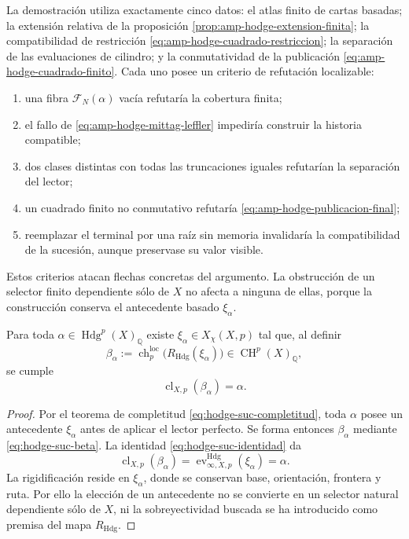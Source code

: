 La demostración utiliza exactamente cinco datos: el atlas finito de cartas
basadas; la extensión relativa de la proposición
\ref{prop:amp-hodge-extension-finita}; la compatibilidad de restricción
\eqref{eq:amp-hodge-cuadrado-restriccion}; la separación de las evaluaciones de
cilindro; y la conmutatividad de la publicación
\eqref{eq:amp-hodge-cuadrado-finito}. Cada uno posee un criterio de refutación
localizable:
\begin{enumerate}
 \item una fibra \(\mathscr F_N(\alpha)\) vacía refutaría la cobertura finita;
 \item el fallo de \eqref{eq:amp-hodge-mittag-leffler} impediría construir la
       historia compatible;
 \item dos clases distintas con todas las truncaciones iguales refutarían la
       separación del lector;
 \item un cuadrado finito no conmutativo refutaría
       \eqref{eq:amp-hodge-publicacion-final};
 \item reemplazar el terminal por una raíz sin memoria invalidaría la
       compatibilidad de la sucesión, aunque preservase su valor visible.
\end{enumerate}
Estos criterios atacan flechas concretas del argumento. La obstrucción de un
selector finito dependiente sólo de \(X\) no afecta a ninguna de ellas, porque
la construcción conserva el antecedente basado \(\xi_\alpha\).

\begin{theorem}
\label{thm:hodge-suc-generacion}
Para toda \(\alpha\in\operatorname{Hdg}^{p}(X)_{\mathbb Q}\) existe
\(\xi_{\alpha}\in X_{\chi}(X,p)\) tal que, al definir
\begin{equation}\label{eq:hodge-suc-beta}
 \beta_{\alpha}:=
 \operatorname{ch}^{\mathrm{loc}}_{p}
 \bigl(R_{\mathrm{Hdg}}(\xi_{\alpha})\bigr)
 \in\operatorname{CH}^{p}(X)_{\mathbb Q},
\end{equation}
se cumple
\begin{equation}\label{eq:hodge-suc-cl-beta}
 \operatorname{cl}_{X,p}(\beta_{\alpha})=\alpha.
\end{equation}
\end{theorem}

\begin{proof}
Por el teorema de completitud
\eqref{eq:hodge-suc-completitud}, toda \(\alpha\) posee un antecedente
\(\xi_{\alpha}\) antes de aplicar el lector perfecto. Se forma entonces
\(\beta_{\alpha}\) mediante \eqref{eq:hodge-suc-beta}. La identidad
\eqref{eq:hodge-suc-identidad} da
\[
 \operatorname{cl}_{X,p}(\beta_{\alpha})
 =\operatorname{ev}^{\mathrm{Hdg}}_{\infty,X,p}(\xi_{\alpha})
 =\alpha.
\]
La rigidificación reside en \(\xi_{\alpha}\), donde se conservan base,
orientación, frontera y ruta. Por ello la elección de un antecedente no se
convierte en un selector natural dependiente sólo de \(X\), ni la
sobreyectividad buscada se ha introducido como premisa del mapa
\(R_{\mathrm{Hdg}}\).
\end{proof}

